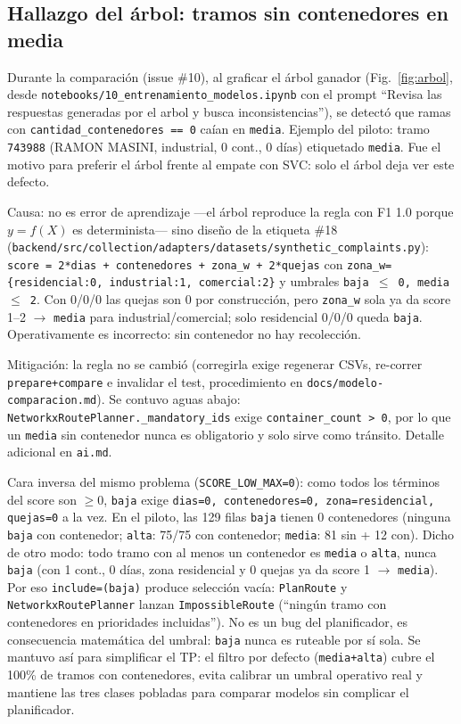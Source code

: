 \documentclass[11pt,a4paper]{article}
\begin{document}
\subsection{Hallazgo del árbol: tramos sin contenedores en media}
Durante la comparación (issue \#10), al graficar el árbol ganador (Fig.~\ref{fig:arbol}, desde \texttt{notebooks/10\_entrenamiento\_modelos.ipynb} con el prompt ``Revisa las respuestas generadas por el arbol y busca inconsistencias''), se detectó que ramas con \texttt{cantidad\_contenedores == 0} caían en \texttt{media}. Ejemplo del piloto: tramo \texttt{743988} (RAMON MASINI, industrial, 0 cont., 0 días) etiquetado \texttt{media}. Fue el motivo para preferir el árbol frente al empate con SVC: solo el árbol deja ver este defecto.

Causa: no es error de aprendizaje ---el árbol reproduce la regla con F1 1.0 porque $y=f(X)$ es determinista--- sino diseño de la etiqueta \#18 (\texttt{backend/src/collection/adapters/datasets/synthetic\_complaints.py}): \texttt{score = 2*dias + contenedores + zona\_w + 2*quejas} con \texttt{zona\_w=\{residencial:0, industrial:1, comercial:2\}} y umbrales \texttt{baja $\leq$ 0, media $\leq$ 2}. Con 0/0/0 las quejas son 0 por construcción, pero \texttt{zona\_w} sola ya da score 1--2 $\rightarrow$ \texttt{media} para industrial/comercial; solo residencial 0/0/0 queda \texttt{baja}. Operativamente es incorrecto: sin contenedor no hay recolección.

Mitigación: la regla no se cambió (corregirla exige regenerar CSVs, re-correr \texttt{prepare+compare} e invalidar el test, procedimiento en \texttt{docs/modelo-comparacion.md}). Se contuvo aguas abajo: \texttt{NetworkxRoutePlanner.\_mandatory\_ids} exige \texttt{container\_count > 0}, por lo que un \texttt{media} sin contenedor nunca es obligatorio y solo sirve como tránsito. Detalle adicional en \texttt{ai.md}.

Cara inversa del mismo problema (\texttt{SCORE\_LOW\_MAX=0}): como todos los términos del score son $\geq 0$, \texttt{baja} exige \texttt{dias=0, contenedores=0, zona=residencial, quejas=0} a la vez. En el piloto, las 129 filas \texttt{baja} tienen 0 contenedores (ninguna \texttt{baja} con contenedor; \texttt{alta}: 75/75 con contenedor; \texttt{media}: 81 sin + 12 con). Dicho de otro modo: todo tramo con al menos un contenedor es \texttt{media} o \texttt{alta}, nunca \texttt{baja} (con 1 cont., 0 días, zona residencial y 0 quejas ya da score 1 $\rightarrow$ \texttt{media}). Por eso \texttt{include=(baja)} produce selección vacía: \texttt{PlanRoute} y \texttt{NetworkxRoutePlanner} lanzan \texttt{ImpossibleRoute} (``ningún tramo con contenedores en prioridades incluidas''). No es un bug del planificador, es consecuencia matemática del umbral: \texttt{baja} nunca es ruteable por sí sola. Se mantuvo así para simplificar el TP: el filtro por defecto (\texttt{media+alta}) cubre el 100\% de tramos con contenedores, evita calibrar un umbral operativo real y mantiene las tres clases pobladas para comparar modelos sin complicar el planificador.
\end{document}
